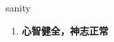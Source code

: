 
\begin{frame}
{\huge sanity}
\begin{center}
\begin{enumerate}\Large
  \item \textbf{心智健全，神志正常}
\end{enumerate}
\end{center}
\end{frame}
